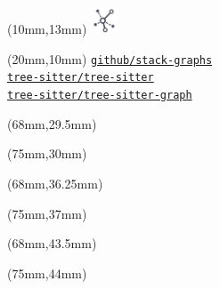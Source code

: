 \documentclass[aspectratio=169]{beamer}
\begin{document}
\begin{frame}
    \begin{textblock*}{10mm}(10mm,13mm)
        \includegraphics[width=8mm]{images/graph.jpg}
    \end{textblock*}
    \begin{textblock*}{60mm}(20mm,10mm)
        \href{https://github.com/github/stack-graphs}{\texttt{github/stack-graphs}} \\
        \href{https://github.com/tree-sitter/tree-sitter}{\texttt{tree-sitter/tree-sitter}} \\
        \href{https://github.com/tree-sitter/tree-sitter-graph}{\texttt{tree-sitter/tree-sitter-graph}} \\
    \end{textblock*}

    \begin{textblock*}{10mm}(68mm,29.5mm)
    \end{textblock*}
    \begin{textblock*}{60mm}(75mm,30mm)
    \end{textblock*}

    \begin{textblock*}{10mm}(68mm,36.25mm)
    \end{textblock*}
    \begin{textblock*}{60mm}(75mm,37mm)
    \end{textblock*}

    \begin{textblock*}{10mm}(68mm,43.5mm)
    \end{textblock*}
    \begin{textblock*}{60mm}(75mm,44mm)
    \end{textblock*}


\end{frame}
\end{document}
